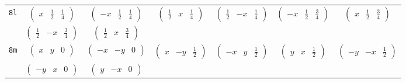 \documentclass[fleqn,9pt,landscape]{jsarticle}
\begin{document}
\begin{center}
\begin{longtable}{ccccccc}
{\tt 8l} & $ \begin{pmatrix} x & \frac{1}{2} & \frac{1}{4} \end{pmatrix} $ & $ \begin{pmatrix} - x & \frac{1}{2} & \frac{1}{4} \end{pmatrix} $ & $ \begin{pmatrix} \frac{1}{2} & x & \frac{1}{4} \end{pmatrix} $ & $ \begin{pmatrix} \frac{1}{2} & - x & \frac{1}{4} \end{pmatrix} $ & $ \begin{pmatrix} - x & \frac{1}{2} & \frac{3}{4} \end{pmatrix} $ & $ \begin{pmatrix} x & \frac{1}{2} & \frac{3}{4} \end{pmatrix} $ \\
& $ \begin{pmatrix} \frac{1}{2} & - x & \frac{3}{4} \end{pmatrix} $ & $ \begin{pmatrix} \frac{1}{2} & x & \frac{3}{4} \end{pmatrix} $ & $  $ & $  $ & $  $ & $  $ \\ \hline
{\tt 8m} & $ \begin{pmatrix} x & y & 0 \end{pmatrix} $ & $ \begin{pmatrix} - x & - y & 0 \end{pmatrix} $ & $ \begin{pmatrix} x & - y & \frac{1}{2} \end{pmatrix} $ & $ \begin{pmatrix} - x & y & \frac{1}{2} \end{pmatrix} $ & $ \begin{pmatrix} y & x & \frac{1}{2} \end{pmatrix} $ & $ \begin{pmatrix} - y & - x & \frac{1}{2} \end{pmatrix} $ \\
& $ \begin{pmatrix} - y & x & 0 \end{pmatrix} $ & $ \begin{pmatrix} y & - x & 0 \end{pmatrix} $ & $  $ & $  $ & $  $ & $  $ \\ \hline

\end{longtable}
\end{center}
\end{document}
